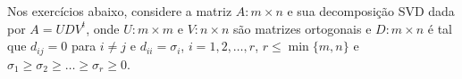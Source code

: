 % 
% 
% 
% 
%
% 
%
%
Nos exerc\'{i}cios abaixo, considere a matriz $A : m \times n$ e sua decomposi\c{c}\~{a}o SVD dada por $A = U D V^t$, onde $U : m \times m$ e $V : n \times n$ s\~{a}o matrizes ortogonais e $D : m \times n$ \'{e} tal que $d_{ij} = 0$ para $i \neq j$ e $d_{ii} = \sigma_i$, $i = 1, 2, \ldots, r$, $r \leq \min\{m, n\}$ e $ \sigma_1 \geq \sigma_2 \geq \ldots \geq \sigma_r \geq 0$.
